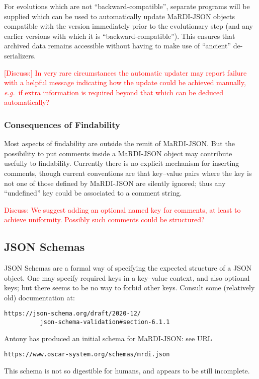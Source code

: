 \documentclass{article}
\newcommand{\MaRDIJSON}{MaRDI-JSON}
\newcommand \eg {\textit{e.g.}}
\def\red#1{\textcolor{red}{#1}}
\begin{document}
For evolutions which are not ``backward-compatible'', separate
programs will be supplied which can be used to automatically update
{\MaRDIJSON} objects compatible with the version immediately prior to
the evolutionary step (and any earlier versions with which it is
``backward-compatible'').  This ensures that archived data remains
accessible without having to make use of ``ancient'' de-serializers.


\red{[Discuss:] In very rare circumstances the automatic updater may
  report failure with a helpful message indicating how the update
  could be achieved manually, \eg~if extra information is required
  beyond that which can be deduced automatically?}




\subsubsection{Consequences of Findability}

Most aspects of findability are outside the remit of {\MaRDIJSON}.
But the possibility to put comments inside a {\MaRDIJSON} object
may contribute usefully to findability.  Currently there is no
explicit mechanism for inserting comments, though current conventions
are that key--value pairs where the key is not one of those defined
by {\MaRDIJSON} are silently ignored; thus any ``undefined'' key
could be associated to a comment string.

\red{Discuss: We suggest adding an optional named key for comments, at least
to achieve uniformity.  Possibly such comments could be structured?}


\subsection{JSON Schemas}

JSON Schemas are a formal way of specifying the expected structure of
a JSON object.  One may specify required keys in a key--value context,
and also optional keys; but there seems to be no way to forbid other
keys.  Consult some (relatively old) documentation at:
\begin{verbatim}
https://json-schema.org/draft/2020-12/
          json-schema-validation#section-6.1.1
\end{verbatim}

Antony has produced an initial schema for {\MaRDIJSON}: see URL
\begin{verbatim}
https://www.oscar-system.org/schemas/mrdi.json
\end{verbatim}
This schema is not so digestible for humans, and appears to be still incomplete.
\end{document}

